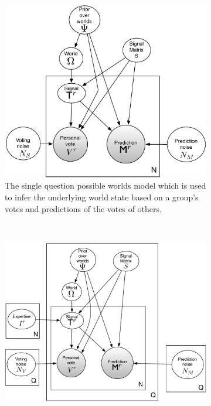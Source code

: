 \documentclass{report}
\theoremstyle{definition}
\begin{document}
\newpage
\thispagestyle{empty}
\begin{figure}[]
 \vspace*{-3cm}
\begin{subfigure}{\textwidth}
    \includegraphics[width=\textwidth]{basic_generative_votes_updated.pdf}
    \caption{The single question possible worlds model which is used to infer the underlying world state based on a group’s votes and predictions of the votes of others.}
    \label{fig:pwm_single}
\end{subfigure} \\
\begin{subfigure}{\textwidth}
    \includegraphics[width=\textwidth]{generative_individual_expertise_votes_updated.pdf}

\end{subfigure}
\end{figure}
\end{document}
